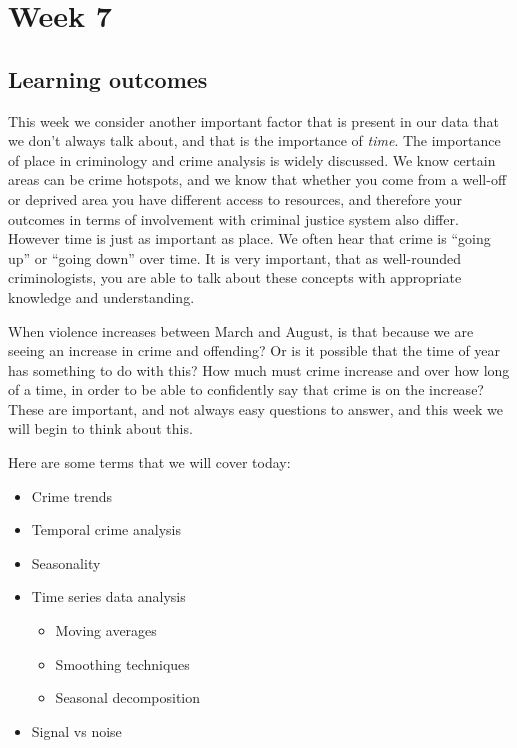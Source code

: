 \documentclass[
]{book}
\providecommand{\tightlist}{%
  \setlength{\itemsep}{0pt}\setlength{\parskip}{0pt}}
\begin{document}
\hypertarget{week7}{%
\chapter{Week 7}\label{week7}}

\hypertarget{learning-outcomes-6}{%
\section{Learning outcomes}\label{learning-outcomes-6}}

This week we consider another important factor that is present in our data that we don't always talk about, and that is the importance of \emph{time}. The importance of place in criminology and crime analysis is widely discussed. We know certain areas can be crime hotspots, and we know that whether you come from a well-off or deprived area you have different access to resources, and therefore your outcomes in terms of involvement with criminal justice system also differ. However time is just as important as place. We often hear that crime is ``going up'' or ``going down'' over time. It is very important, that as well-rounded criminologists, you are able to talk about these concepts with appropriate knowledge and understanding.

When violence increases between March and August, is that because we are seeing an increase in crime and offending? Or is it possible that the time of year has something to do with this? How much must crime increase and over how long of a time, in order to be able to confidently say that crime is on the increase? These are important, and not always easy questions to answer, and this week we will begin to think about this.

Here are some terms that we will cover today:

\begin{itemize}
\tightlist
\item
  Crime trends
\item
  Temporal crime analysis
\item
  Seasonality
\item
  Time series data analysis

  \begin{itemize}
  \tightlist
  \item
    Moving averages
  \item
    Smoothing techniques
  \item
    Seasonal decomposition
  \end{itemize}
\item
  Signal vs noise
\end{itemize}
\end{document}
